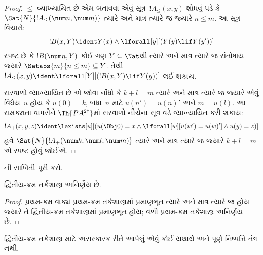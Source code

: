 \begin{proof}
$\le$ વ્યાખ્યાયિત છે એમ બતાવવા એવું સૂત્ર~$!A_\le(x, y)$ શોધવું
પડે કે $\Sat{N}{!A_\le(\num n, \num m)}$ ત્યારે અને માત્ર ત્યારે જ
જ્યારે $n \le m$. આ સૂત્ર વિચારો:
\[
!B(x, Y) \ident Y(x) \land \lforall[y][(Y(y) \lif Y(y'))]
\]
સ્પષ્ટ છે કે $!B(\num n, Y)$ કોઈ ગણ $Y \subseteq \Nat$થી ત્યારે
અને માત્ર ત્યારે જ સંતોષાય જ્યારે $\Setabs{m}{n \le m} \subseteq Y$.
તેથી $!A_\le(x, y) \ident
\lforall[Y][(!B(x, Y) \lif Y(y))]$ લઈ શકાય.

સરવાળો વ્યાખ્યાયિત છે એ જોવા નોંધો કે $k+l=m$ ત્યારે અને માત્ર ત્યારે
જ જ્યારે એવું વિધેય~$u$ હોય કે $u(0)=k$, બધા~$n$ માટે
$u(n')=u(n)'$ અને $m = u(l)$. આ સમકક્ષતા વાપરીને
$\Th{PA^{2\dagger}}$માં સરવાળો નીચેના સૂત્ર વડે વ્યાખ્યાયિત કરી
શકાય:
\[
!A_+(x,y,z) \ident \lexists[u][(u(\Obj 0)=x \land \lforall[w][u(w')=u
 (w)'] \land u(y)=z)]
\]
હવે $\Sat{N}{!A_+(\num k, \num l, \num m)}$ ત્યારે અને માત્ર
ત્યારે જ જ્યારે $k+l=m$ એ સ્પષ્ટ હોવું જોઈએ.
\end{proof}

\begin{prob}
ની સાબિતી પૂરી કરો.
\end{prob}
\endgroup


\begingroup
\makeatletter{}\makeatother


\label{guunit:OLP-0333}



\begin{thm}
દ્વિતીય-ક્રમ તર્કશાસ્ત્ર અનિર્ણેય છે.
\end{thm}

\begin{proof}
પ્રથમ-ક્રમ વાક્ય પ્રથમ-ક્રમ તર્કશાસ્ત્રમાં પ્રમાણભૂત ત્યારે
અને માત્ર ત્યારે જ હોય જ્યારે તે દ્વિતીય-ક્રમ તર્કશાસ્ત્રમાં
પ્રમાણભૂત હોય; વળી પ્રથમ-ક્રમ તર્કશાસ્ત્ર અનિર્ણેય છે.
\end{proof}

\begin{thm}
દ્વિતીય-ક્રમ તર્કશાસ્ત્ર માટે અસરકારક રીતે આપેલું એવું કોઈ યથાર્થ અને
પૂર્ણ નિષ્પત્તિ તંત્ર નથી.
\end{thm}

